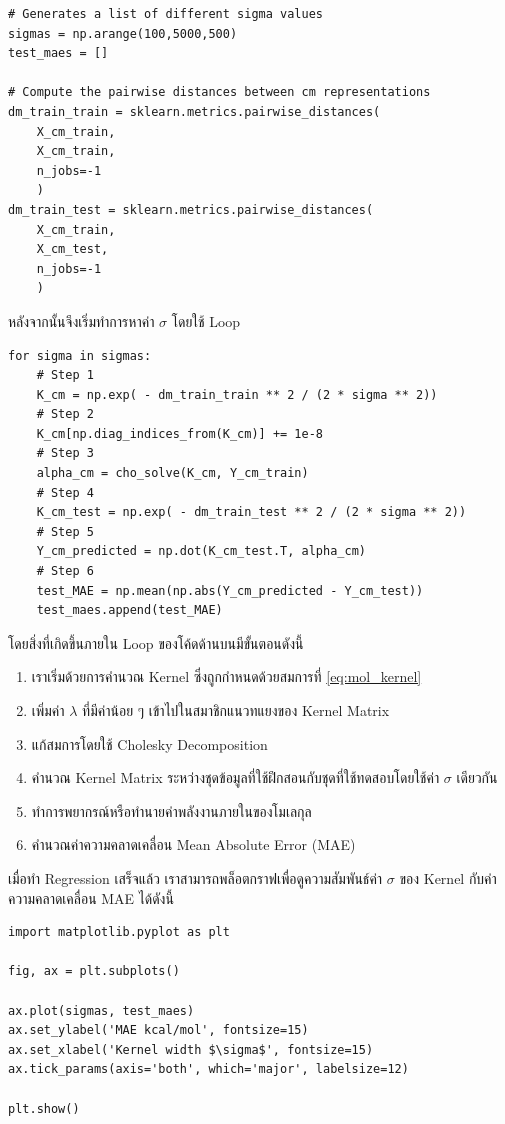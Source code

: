 \begin{lstlisting}[style=MyPython]
# Generates a list of different sigma values
sigmas = np.arange(100,5000,500) 
test_maes = []

# Compute the pairwise distances between cm representations
dm_train_train = sklearn.metrics.pairwise_distances(
    X_cm_train, 
    X_cm_train, 
    n_jobs=-1
    )
dm_train_test = sklearn.metrics.pairwise_distances(
    X_cm_train, 
    X_cm_test, 
    n_jobs=-1
    )
\end{lstlisting}

\vspace{1em}

\noindent หลังจากนั้นจึงเริ่มทำการหาค่า $\sigma$ โดยใช้ Loop

\begin{lstlisting}[style=MyPython]
for sigma in sigmas:
    # Step 1
    K_cm = np.exp( - dm_train_train ** 2 / (2 * sigma ** 2)) 
    # Step 2
    K_cm[np.diag_indices_from(K_cm)] += 1e-8
    # Step 3
    alpha_cm = cho_solve(K_cm, Y_cm_train)
    # Step 4
    K_cm_test = np.exp( - dm_train_test ** 2 / (2 * sigma ** 2))
    # Step 5
    Y_cm_predicted = np.dot(K_cm_test.T, alpha_cm)
    # Step 6
    test_MAE = np.mean(np.abs(Y_cm_predicted - Y_cm_test))
    test_maes.append(test_MAE)
\end{lstlisting}
%
\vspace{1em}
%
โดยสิ่งที่เกิดขึ้นภายใน Loop ของโค้ดด้านบนมีขั้นตอนดังนี้
%
\begin{enumerate}[topsep=0pt,noitemsep]\setlength\itemsep{0.5em}
    \item เราเริ่มด้วยการคำนวณ Kernel ซึ่งถูกกำหนดด้วยสมการที่ \eqref{eq:mol_kernel}

    \item เพิ่มค่า $\lambda$ ที่มีค่าน้อย ๆ เข้าไปในสมาชิกแนวทแยงของ Kernel Matrix

    \item แก้สมการโดยใช้ Cholesky Decomposition

    \item คำนวณ Kernel Matrix ระหว่างชุดข้อมูลที่ใช้ฝึกสอนกับชุดที่ใช้ทดสอบโดยใช้ค่า $\sigma$ เดียวกัน

    \item ทำการพยากรณ์หรือทำนายค่าพลังงานภายในของโมเลกุล

    \item คำนวณค่าความคลาดเคลื่อน Mean Absolute Error (MAE)
\end{enumerate}

\noindent เมื่อทำ Regression เสร็จแล้ว เราสามารถพล็อตกราฟเพื่อดูความสัมพันธ์ค่า $\sigma$ ของ Kernel กับค่าความคลาดเคลื่อน MAE ได้ดังนี้
%
\begin{lstlisting}[style=MyPython]
import matplotlib.pyplot as plt

fig, ax = plt.subplots()

ax.plot(sigmas, test_maes)
ax.set_ylabel('MAE kcal/mol', fontsize=15)
ax.set_xlabel('Kernel width $\sigma$', fontsize=15)
ax.tick_params(axis='both', which='major', labelsize=12)

plt.show()
\end{lstlisting}

